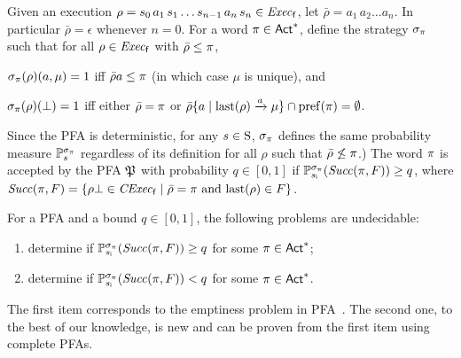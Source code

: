 Given an execution
$\rho = s_0\,a_1\,s_1\ldots s_{n-1}\,a_n\,s_n \in \execf$,
let $\bar{\rho} = a_1\, a_2\ldots a_n$.  In particular
$\bar{\rho} = \epsilon$ whenever $n=0$.
%
For a word $\plan\in\Act^*$, define the strategy $\strat_\plan$ such
that for all $\rho\in\execf$ with $\bar{\rho}\leq\plan$,
%
\begin{enumerate*}[(i)]
\item%
  $\strat_\plan(\rho)(a,\mu)=1$ iff $\bar{\rho}a\leq\plan$ (in which
  case $\mu$ is unique), and
\item%
  $\strat_\plan(\rho)(\complete)=1$ iff either $\bar{\rho}=\plan$ or
  $\bar{\rho}\{a\mid{\last(\rho)\reach{a}\mu}\}\cap\pref(\plan) = \emptyset$.
\end{enumerate*}
%
Since the PFA is deterministic, for any $s\in\S$, $\strat_\plan$
defines the same probability measure $\Prob_s^{\strat_\plan}$
regardless of its definition for all $\rho$ such that
$\bar{\rho}\not\leq\plan$.) 
%
The word $\plan$ is accepted by the PFA $\pfa$ with probability
$q\in[0,1]$ if $\Prob_{\sini}^{\strat_\plan}(\Succ(\plan,F))\geq q$, where
$\Succ(\plan,F)=\{{\rho\complete\in\cexecf}\mid{\bar{\rho}=\plan \text{ and } \last(\rho)\in F}\}$.
%

\begin{proposition}\label{prop:PFA:undecidabilty}
  For a PFA and a bound $q\in[0,1]$, the following problems are undecidable:
  \begin{enumerate}
  \item\label{prop:PFA:undecidabilty:high}%
    determine if $\Prob_{\sini}^{\strat_\plan}(\Succ(\plan,F)) \geq q$
    for some $\plan\in\Act^*$;
  \item\label{prop:PFA:undecidabilty:low}%
    determine if $\Prob_{\sini}^{\strat_\plan}(\Succ(\plan,F)) < q$
    for some $\plan\in\Act^*$.
  \end{enumerate}
\end{proposition}

The first item corresponds to the emptiness problem in
PFA~\cite{Paz71,MadaniHC99}.
%
The second one,  to the best of our knowledge,  is new and can be
proven from the first item using complete PFAs.
%
%


